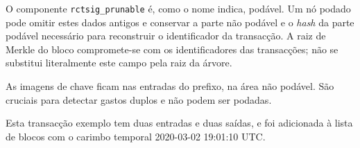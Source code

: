 \begin{appendices}

O componente {\tt rctsig\_prunable} é, como o nome indica, podável. Um nó
podado pode omitir estes dados antigos e conservar a parte não podável e o
\emph{hash} da parte podável necessário para reconstruir o identificador da
transacção. A raiz de Merkle do bloco compromete-se com os identificadores das
transacções; não se substitui literalmente este campo pela raiz da árvore.


As imagens de chave ficam nas entradas do prefixo, na área não podável. São
cruciais para detectar gastos duplos e não podem ser podadas.

Esta transacção exemplo tem duas entradas e duas saídas, e foi adicionada à
lista de blocos com o carimbo temporal 2020-03-02 19:01:10 UTC.


\end{appendices}
